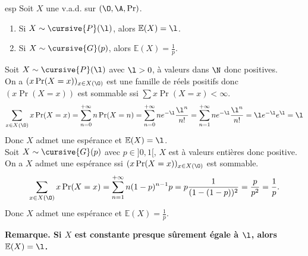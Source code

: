 \documentclass[11pt]{article}
\renewcommand*{\E}{\mathbb{E}}
\begin{document}
\begin{prop}{}{esp}
    Soit $X$ une v.a.d. sur $(\O,\A,\Pr)$. 
    \begin{enumerate} \item Si $X\sim\cursive{P}(\l)$, alors $\E(X)=\l$. \item Si $X\sim\cursive{G}(p)$, alors $\E(X)=\frac{1}{p}$. \end{enumerate}
    \tcblower
    \small
     Soit $X\sim\cursive{P}(\l)$ avec $\l>0$, à valeurs dans $\N$ donc positives.\\
    On a $(x\Pr(X=x))_{x\in X(\O)}$ est une famille de réels positifs donc $(x\Pr(X=x))$ est sommable ssi $\sum x\Pr(X=x)<\infty$.
    \begin{equation*} \sum_{x\in X(\O)}x\Pr(X=x)=\sum_{n=0}^{+\infty} n\Pr(X=n)=\sum_{n=0}^{+\infty}ne^{-\l}\frac{\l^n}{n!} = \sum_{n=1}^{+\infty} ne^{-\l}\frac{\l^n}{n!}=\l e^{-\l} e^\l = \l\end{equation*}
    Donc $X$ admet une espérance et $\E(X)=\l$.\\
     Soit $X\sim\cursive{G}(p)$ avec $p\in]0,1[$, $X$ est à valeurs entières donc positive.\\
    On a $X$ admet une espérance ssi $(x\Pr(X=x))_{x\in X(\O)}$ est sommable.
    \begin{equation*}
        \sum_{x\in X(\O)}x\Pr(X=x) = \sum_{n=1}^{+\infty}n(1-p)^{n-1}p = p\frac{1}{(1-(1-p))^2} = \frac{p}{p^2} = \frac{1}{p}.
    \end{equation*}
    Donc $X$ admet une espérance et $\E(X)=\frac{1}{p}$.
\end{prop}

\bf{Remarque.} Si $X$ est constante presque sûrement égale à $\l$, alors $\E(X)=\l$.
\end{document}
